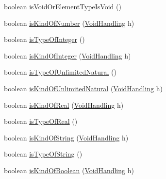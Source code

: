 \begin{DoxyCompactItemize}
boolean \hyperlink{classorg_1_1tzi_1_1use_1_1uml_1_1mm_1_1_m_classifier_impl_aa9eb15aeaa25bd6abb3f33cd19ea347d}{is\-Void\-Or\-Element\-Type\-Is\-Void} ()
\item 
boolean \hyperlink{classorg_1_1tzi_1_1use_1_1uml_1_1mm_1_1_m_classifier_impl_aee36072fc6326eacc0f96bd853b35328}{is\-Kind\-Of\-Number} (\hyperlink{enumorg_1_1tzi_1_1use_1_1uml_1_1ocl_1_1type_1_1_type_1_1_void_handling}{Void\-Handling} h)
\item 
boolean \hyperlink{classorg_1_1tzi_1_1use_1_1uml_1_1mm_1_1_m_classifier_impl_a8847f4197c853080ed0ce97f3c6c1206}{is\-Type\-Of\-Integer} ()
\item 
boolean \hyperlink{classorg_1_1tzi_1_1use_1_1uml_1_1mm_1_1_m_classifier_impl_a2a543c0eab8e16e655bb0afc7ac32a99}{is\-Kind\-Of\-Integer} (\hyperlink{enumorg_1_1tzi_1_1use_1_1uml_1_1ocl_1_1type_1_1_type_1_1_void_handling}{Void\-Handling} h)
\item 
boolean \hyperlink{classorg_1_1tzi_1_1use_1_1uml_1_1mm_1_1_m_classifier_impl_adab2772be8be43aaa01218005856cc73}{is\-Type\-Of\-Unlimited\-Natural} ()
\item 
boolean \hyperlink{classorg_1_1tzi_1_1use_1_1uml_1_1mm_1_1_m_classifier_impl_a0ac18cf96f9d5a7c59519ea54fa7fcc6}{is\-Kind\-Of\-Unlimited\-Natural} (\hyperlink{enumorg_1_1tzi_1_1use_1_1uml_1_1ocl_1_1type_1_1_type_1_1_void_handling}{Void\-Handling} h)
\item 
boolean \hyperlink{classorg_1_1tzi_1_1use_1_1uml_1_1mm_1_1_m_classifier_impl_aca3b8e82dae721db677688c79f97a590}{is\-Kind\-Of\-Real} (\hyperlink{enumorg_1_1tzi_1_1use_1_1uml_1_1ocl_1_1type_1_1_type_1_1_void_handling}{Void\-Handling} h)
\item 
boolean \hyperlink{classorg_1_1tzi_1_1use_1_1uml_1_1mm_1_1_m_classifier_impl_ae3bdbf6c73d8c0f762d19db94871654d}{is\-Type\-Of\-Real} ()
\item 
boolean \hyperlink{classorg_1_1tzi_1_1use_1_1uml_1_1mm_1_1_m_classifier_impl_a2e6bf9c876dc6eedd91bc3beea1836b4}{is\-Kind\-Of\-String} (\hyperlink{enumorg_1_1tzi_1_1use_1_1uml_1_1ocl_1_1type_1_1_type_1_1_void_handling}{Void\-Handling} h)
\item 
boolean \hyperlink{classorg_1_1tzi_1_1use_1_1uml_1_1mm_1_1_m_classifier_impl_a1b7a3ab27e80d204a85fcaa3d061cdf6}{is\-Type\-Of\-String} ()
\item 
boolean \hyperlink{classorg_1_1tzi_1_1use_1_1uml_1_1mm_1_1_m_classifier_impl_ad4ce761199bba92a2058f5785dc4f9f9}{is\-Kind\-Of\-Boolean} (\hyperlink{enumorg_1_1tzi_1_1use_1_1uml_1_1ocl_1_1type_1_1_type_1_1_void_handling}{Void\-Handling} h)

\end{DoxyCompactItemize}
